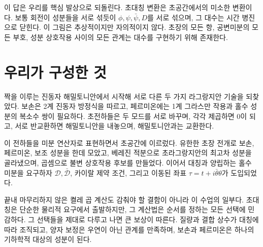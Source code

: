 \begin{classroomqa}
\end{classroomqa}

이 답은 우리를 핵심 발상으로 되돌린다. 초대칭 변환은 초공간에서의 미소한 변환이다. 보통 회전이 성분들을 서로 섞듯이 \(\phi,\psi,\bar\psi,D\)를 서로 섞으며, 그 대수는 시간 병진으로 닫힌다. 이 그림은 추상적이지만 자의적이지 않다. 초장의 모든 항, 공변미분의 모든 부호, 성분 상호작용 사이의 모든 관계는 대수를 구현하기 위해 존재한다.

\section{우리가 구성한 것}

짝을 이루는 진동자 해밀토니안에서 시작해 서로 다른 두 가지 라그랑지안 기술을 되찾았다. 보손은 2계 진동자 방정식을 따르고, 페르미온에는 1계 그라스만 작용과 홀수 성분의 복소수 쌍이 필요하다. 초전하들은 두 모드를 서로 바꾸며, 각각 제곱하면 0이 되고, 서로 반교환하면 해밀토니안을 내놓으며, 해밀토니안과는 교환한다.

이 전하들을 미분 연산자로 표현하면서 초공간에 이르렀다. 유한한 초장 전개로 보손, 페르미온, 보조 성분을 한데 모았고, 베레진 적분으로 초라그랑지안의 최고차 성분을 골라냈으며, 곱셈으로 불변 상호작용 후보를 만들었다. 이어서 대칭과 양립하는 홀수 미분을 요구하자 \(\mathcal D,\bar{\mathcal D}\), 카이랄 제약 조건, 그리고 이동된 좌표 \(\tau=t+i\bar\theta\theta\)가 도입되었다.

끝내 마무리하지 않은 켤레 곱 계산도 감춰야 할 결함이 아니라 이 수업의 일부다. 초대칭은 단순한 물리적 요구에서 출발하지만, 그 계산법은 순서를 정하는 모든 선택에 민감하다. 그 선택들을 제대로 다루고 나면 큰 보상이 따른다. 질량과 결합 상수가 대칭에 따라 조직되고, 양자 보정은 우연이 아닌 관계를 만족하며, 보손과 페르미온은 하나의 기하학적 대상의 성분이 된다.
